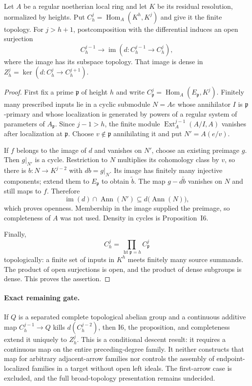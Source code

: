 \begin{proposition}
Let $A$ be a regular noetherian local ring and let $K$ be its residual
resolution, normalized by heights. Put
$C_h^j=\operatorname{Hom}_A(K^h,K^j)$ and give it the finite topology.
For $j>h+1$, postcomposition with the differential induces an open
surjection
\[
 C_h^{j-1}\longrightarrow
 \operatorname{im}(d:C_h^{j-1}\to C_h^j),
\]
where the image has its subspace topology. That image is dense in
$Z_h^j=\ker(d:C_h^j\to C_h^{j+1})$.
\end{proposition}
\begin{proof}
First fix a prime $\mathfrak p$ of height $h$ and write
$C_{\mathfrak p}^j=\operatorname{Hom}_A(E_{\mathfrak p},K^j)$.
Finitely many prescribed inputs lie in a cyclic submodule $N=Ae$
whose annihilator $I$ is $\mathfrak p$-primary and whose localization
is generated by powers of a regular system of parameters of
$A_{\mathfrak p}$. Since $j-1>h$, the finite module
$\operatorname{Ext}_A^{j-1}(A/I,A)$ vanishes after localization at
$\mathfrak p$. Choose $v\notin\mathfrak p$ annihilating it and
put $N'=A(e/v)$.

If $f$ belongs to the image of $d$ and vanishes on $N'$, choose an
existing preimage $g$. Then $g|_{N'}$ is a cycle. Restriction to
$N$ multiplies its cohomology class by $v$, so there is
$b:N\to K^{j-2}$ with $db=g|_N$. Its image has finitely many
injective components; extend them to $E_{\mathfrak p}$ to obtain
$\widetilde b$. The map $g-d\widetilde b$ vanishes on $N$ and
still maps to $f$. Therefore
\[
 \operatorname{im}(d)\cap\operatorname{Ann}(N')
       \subseteq d\bigl(\operatorname{Ann}(N)\bigr),
\]
which proves openness. Membership in the image supplied the
preimage, so completeness of $A$ was not used. Density in cycles
is Proposition~I6.

Finally,
\[
 C_h^j=\prod_{\operatorname{ht}\mathfrak p=h}
             C_{\mathfrak p}^j
\]
topologically: a finite set of inputs in $K^h$ meets finitely many
source summands. The product of open surjections is open, and the
product of dense subgroups is dense. This proves the assertion.
\end{proof}

\paragraph{Exact remaining gate.}
If $Q$ is a separated complete topological abelian group and a
continuous additive map $C_h^{j-1}\to Q$ kills $d(C_h^{j-2})$,
then I6, the proposition, and completeness extend it uniquely to
$Z_h^j$. This is a conditional descent result: it requires a
continuous map on the entire preceding-degree family. It neither
constructs that map for arbitrary adjacent-arrow families nor
controls the assembly of endpoint-localized families in a target
without open left ideals. The first-arrow case is excluded, and
the full broad-topology presentation remains undecided.

